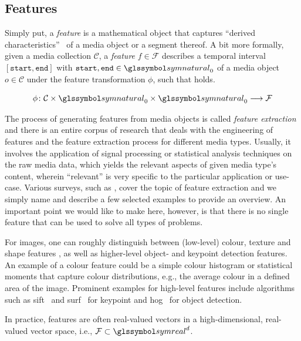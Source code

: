 \subsection{Features}
Simply put, a \emph{feature} is a mathematical object that captures ``derived characteristics''~\cite{Blanken:2007multimedia} of a media object or a segment thereof. A bit more formally, given a media collection $\mathcal{C}$, a \emph{feature} $f \in \mathcal{F}$ describes a temporal interval $[ \texttt{start}, \texttt{end} ]$ with $\texttt{start},\texttt{end} \in \symnatural_0$ of a media object $o \in \mathcal{C}$ under the feature transformation $\phi$, such that  holds.

\begin{equation}
    \label{eq:feature_transformation}
    \phi \colon \mathcal{C} \times \symnatural_0 \times \symnatural_0 \longrightarrow \mathcal{F}
\end{equation}

The process of generating features from media objects is called \emph{feature extraction} \cite{Blanken:2007multimedia} and there is an entire corpus of research that deals with the engineering of features and the feature extraction process for different media types. Usually, it involves the application of signal processing or statistical analysis techniques on the raw media data, which yields the relevant aspects of given media type's content, wherein ``relevant'' is very specific to the particular application or use-case. Various surveys, such as \cite{Ding:2012ASurvey,Salau:2019Feature}, cover the topic of feature extraction and we simply name and describe a few selected examples to provide an overview. An important point we would like to make here, however, is that there is no single feature that can be used to solve all types of problems.

For images, one can roughly distinguish between (low-level) colour, texture and shape features \cite{Salau:2019Feature}, as well as higher-level object- and keypoint detection features. An example of a colour feature could be a simple colour histogram or statistical moments that capture colour distributions, e.g., the average colour in a defined area of the image. Prominent examples for high-level features include algorithms such as \acrfull{sift}~\cite{Lowe:1999object} and \acrfull{surf}~\cite{Bay:2006surf} for keypoint and \acrfull{hog}~\cite{Dalal:2005Histograms} for object detection.
 

In practice, features are often real-valued vectors in a high-dimensional, real-valued vector space, i.e., $\mathcal{F} \subset \symreal^d$. 


